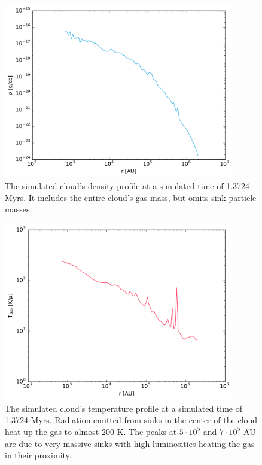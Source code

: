 \begin{figure}[!htb]
 \centering
 \includegraphics[width=0.9\textwidth]{Figures/cloud_profiles/density_profile}
 \captionsetup{justification=justified,singlelinecheck=false,width=\linewidth}
 \decoRule
 \caption[Cloud density profile]{The simulated cloud's density profile at a simulated time of 1.3724 Myrs.
                                 It includes the entire cloud's gas mass, but omits sink particle masses.}
 \label{fig:Cloud_density}
\end{figure}

\FloatBarrier

\begin{figure}[!htb]
 \centering
 \includegraphics[width=0.9\textwidth]{Figures/cloud_profiles/temp_profile}
 \captionsetup{justification=justified,singlelinecheck=false,width=\linewidth}
 \decoRule
 \caption[Cloud temperature profile]{The simulated cloud's temperature profile at a simulated time of 1.3724 Myrs.
                                     Radiation emitted from sinks in the center of the cloud heat up the gas to almost 200 K.
                                     The peaks at $5\cdot10^{5}$ and $7\cdot10^{5}$ AU are due to very massive sinks with high luminosities heating the gas in their proximity.}
 \label{fig:Cloud_temperature}
\end{figure}

